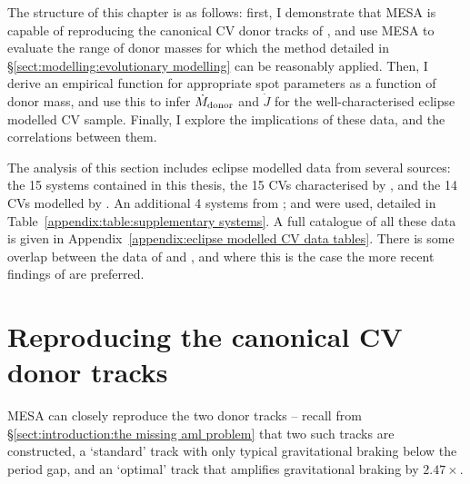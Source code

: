 
\label{chpt:Mass loss and Angular momentum loss in short period CVs} %

The structure of this chapter is as follows: first, I demonstrate that MESA is capable of reproducing the canonical CV donor tracks of \citet{knigge11}, and use MESA to evaluate the range of donor masses for which the method detailed in \S\ref{sect:modelling:evolutionary modelling} can be reasonably applied. Then, I derive an empirical function for appropriate spot parameters as a function of donor mass, and use this to infer $\dot M_{\rm donor}$ and $\dot J$ for the well-characterised eclipse modelled CV sample.
Finally, I explore the implications of these data, and the correlations between them.

The analysis of this section includes eclipse modelled data from several sources: the 15 systems contained in this thesis, the 15 CVs characterised by \citet{McAllister2019}, and the 14 CVs modelled by \citet{Savoury2011}. An additional 4 systems from \citet{mcallister2015,mcallister2017, mcallister2017b}; and \citet{copperwheat2010} were used, detailed in Table~\ref{appendix:table:supplementary systems}. A full catalogue of all these data is given in Appendix~\ref{appendix:eclipse modelled CV data tables}.
There is some overlap between the data of \citet{McAllister2019} and \citet{Savoury2011}, and where this is the case the more recent findings of \citet{McAllister2019} are preferred.


\section{Reproducing the canonical CV donor tracks}
\label{sect:results:reproducing K11 tracks}

MESA can closely reproduce the two \citet{knigge11} donor tracks -- recall from \S\ref{sect:introduction:the missing aml problem} that two such tracks are constructed, a `standard' track with only typical gravitational braking below the period gap, and an `optimal' track that amplifies gravitational braking by $2.47\times$.

